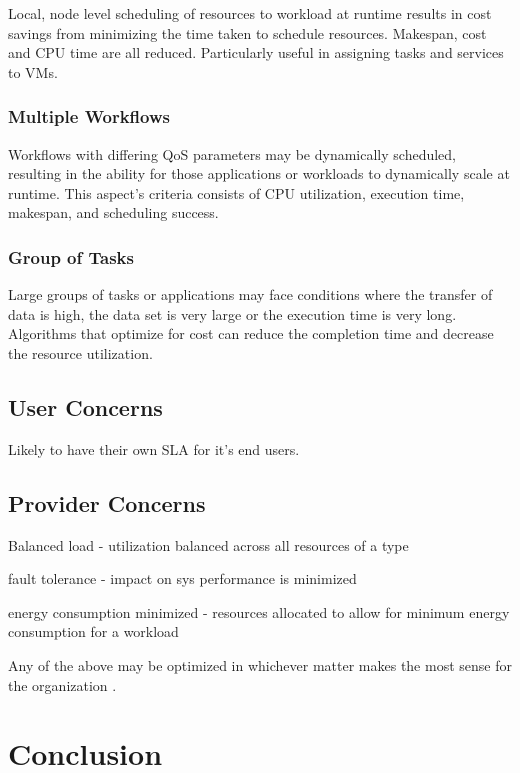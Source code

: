 \documentclass[12pt]{article}
\begin{document}
Local, node level scheduling of resources to workload at runtime results in cost savings from minimizing the time taken to schedule resources. Makespan, cost and CPU time are all reduced. Particularly useful in assigning tasks and services to VMs.

\subsubsection*{Multiple Workflows}

Workflows with differing QoS parameters may be dynamically scheduled, resulting in the ability for those applications or workloads to dynamically scale at runtime. This aspect's criteria consists of CPU utilization, execution time, makespan, and scheduling success.

\subsubsection*{Group of Tasks}

Large groups of tasks or applications may face conditions where the transfer of data is high, the data set is very large or the execution time is very long. Algorithms that optimize for cost can reduce the completion time and decrease the resource utilization.


\subsection{User Concerns}

\cite{Jennings2015}
Likely to have their own SLA for it's end users.


\subsection{Provider Concerns} \label{provider-concerns}



Balanced load - utilization balanced across all resources of a type

fault tolerance - impact on sys performance is minimized

energy consumption minimized - resources allocated to allow for minimum energy consumption for a workload

Any of the above may be optimized in whichever matter makes the most sense for the organization \cite{Jennings2015}.




\section{Conclusion} \label{sec:conclusion}


\printbibliography
\end{document}
